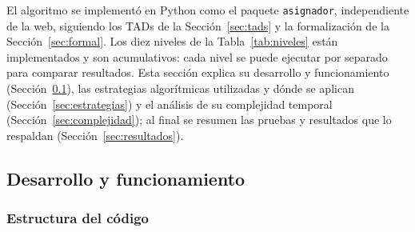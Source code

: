 
El algoritmo se implementó en Python como el paquete \texttt{asignador}, independiente de la web, siguiendo los TADs de la Sección~\ref{sec:tads} y la formalización de la Sección~\ref{sec:formal}. Los diez niveles de la Tabla~\ref{tab:niveles} están implementados y son acumulativos: cada nivel se puede ejecutar por separado para comparar resultados. Esta sección explica su desarrollo y funcionamiento (Sección~\ref{sec:impl}), las estrategias algorítmicas utilizadas y dónde se aplican (Sección~\ref{sec:estrategias}) y el análisis de su complejidad temporal (Sección~\ref{sec:complejidad}); al final se resumen las pruebas y resultados que lo respaldan (Sección~\ref{sec:resultados}).

\subsection{Desarrollo y funcionamiento}\label{sec:impl}

\subsubsection{Estructura del código}

